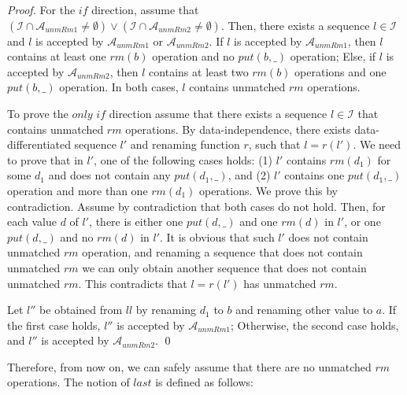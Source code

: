 \documentclass{llncs}
\begin{document}
\begin {proof}

For the $\textit{if}$ direction, assume that $( \mathcal{I} \cap \mathcal{A}_{\textit{unmRm1}} \neq \emptyset) \vee ( \mathcal{I} \cap \mathcal{A}_{\textit{unmRm2}} \neq \emptyset )$. Then, there exists a sequence $l \in \mathcal{I}$ and $l$ is accepted by $\mathcal{A}_{\textit{unmRm1}}$ or $\mathcal{A}_{\textit{unmRm2}}$. If $l$ is accepted by $\mathcal{A}_{\textit{unmRm1}}$, then $l$ contains at least one $\textit{rm}(b)$ operation and no $\textit{put}(b,\_)$ operation; Else, if $l$ is accepted by $\mathcal{A}_{\textit{unmRm2}}$, then $l$ contains at least two $\textit{rm}(b)$ operations and one $\textit{put}(b,\_)$ operation. In both cases, $l$ contains unmatched $\textit{rm}$ operations.

To prove the $\textit{only if}$ direction assume that there exists a sequence $l \in \mathcal{I}$ that contains unmatched $\textit{rm}$ operations. By data-independence, there exists data-differentiated sequence $l'$ and renaming function $r$, such that $l=r(l')$. We need to prove that in $l'$, one of the following cases holds: (1) $l'$ contains $\textit{rm}(d_1)$ for some $d_1$ and does not contain any $\textit{put}(d_1,\_)$, and (2) $l'$ contains one $\textit{put}(d_1,\_)$ operation and more than one $\textit{rm}(d_1)$ operations. We prove this by contradiction. Assume by contradiction that both cases do not hold. Then, for each value $d$ of $l'$, there is either one $\textit{put}(d,\_)$ and one $\textit{rm}(d)$ in $l'$, or one $\textit{put}(d,\_)$ and no $\textit{rm}(d)$ in $l'$. It is obvious that such $l'$ does not contain unmatched $\textit{rm}$ operation, and renaming a sequence that does not contain unmatched $\textit{rm}$ we can only obtain another sequence that does not contain unmatched $\textit{rm}$. This contradicts that $l=r(l')$ has unmatched $\textit{rm}$.

Let $l''$ be obtained from $ll$ by renaming $d_1$ to $b$ and renaming other value to $a$. If the first case holds, $l''$ is accepted by $\mathcal{A}_{\textit{unmRm1}}$; Otherwise, the second case holds, and $l''$ is accepted by $\mathcal{A}_{\textit{unmRm2}}$. \qed
\end {proof}

Therefore, from now on, we can safely assume that there are no unmatched $\textit{rm}$ operations. The notion of $\textit{last}$ is defined as follows:
\end{document}
